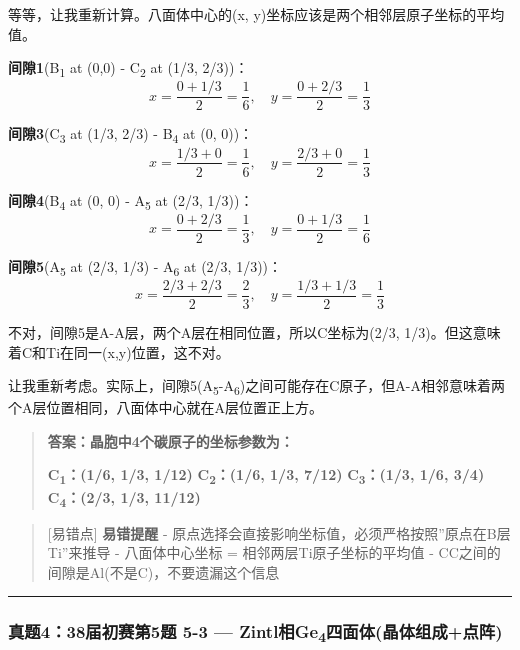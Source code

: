 等等，让我重新计算。八面体中心的(x, y)坐标应该是两个相邻层原子坐标的平均值。

\textbf{间隙1}(B\textsubscript{1} at (0,0) - C\textsubscript{2} at (1/3, 2/3))：
\[x = \frac{0 + 1/3}{2} = \frac{1}{6}, \quad y = \frac{0 + 2/3}{2} = \frac{1}{3}\]

\textbf{间隙3}(C\textsubscript{3} at (1/3, 2/3) - B\textsubscript{4} at (0, 0))：
\[x = \frac{1/3 + 0}{2} = \frac{1}{6}, \quad y = \frac{2/3 + 0}{2} = \frac{1}{3}\]

\textbf{间隙4}(B\textsubscript{4} at (0, 0) - A\textsubscript{5} at (2/3, 1/3))：
\[x = \frac{0 + 2/3}{2} = \frac{1}{3}, \quad y = \frac{0 + 1/3}{2} = \frac{1}{6}\]

\textbf{间隙5}(A\textsubscript{5} at (2/3, 1/3) - A\textsubscript{6} at (2/3, 1/3))：
\[x = \frac{2/3 + 2/3}{2} = \frac{2}{3}, \quad y = \frac{1/3 + 1/3}{2} = \frac{1}{3}\]

不对，间隙5是A-A层，两个A层在相同位置，所以C坐标为(2/3, 1/3)。但这意味着C和Ti在同一(x,y)位置，这不对。

让我重新考虑。实际上，间隙5(A\textsubscript{5}-A\textsubscript{6})之间可能存在C原子，但A-A相邻意味着两个A层位置相同，八面体中心就在A层位置正上方。

\begin{quote}
\textbf{答案：晶胞中4个碳原子的坐标参数为：}

\textbf{C\textsubscript{1}：(1/6, 1/3, 1/12)}
\textbf{C\textsubscript{2}：(1/6, 1/3, 7/12)}
\textbf{C\textsubscript{3}：(1/3, 1/6, 3/4)}
\textbf{C\textsubscript{4}：(2/3, 1/3, 11/12)}
\end{quote}

\begin{quote}
{[}易错点{]} \textbf{易错提醒}
- 原点选择会直接影响坐标值，必须严格按照''原点在B层Ti''来推导
- 八面体中心坐标 = 相邻两层Ti原子坐标的平均值
- CC之间的间隙是Al(不是C)，不要遗漏这个信息
\end{quote}

\begin{center}\rule{0.5\linewidth}{0.5pt}\end{center}

\subsubsection{\texorpdfstring{真题4：38届初赛第5题 5-3 --- Zintl相Ge\textsubscript{4}四面体(晶体组成+点阵)}{真题4：38届初赛第5题 5-3 --- Zintl相Ge4四面体(晶体组成+点阵)}}\label{ux771fux9898438ux5c4aux521dux8d5bux7b2c5ux9898-5-3-zintlux76f8ge4ux56dbux9762ux4f53ux6676ux4f53ux7ec4ux6210ux70b9ux9635}

